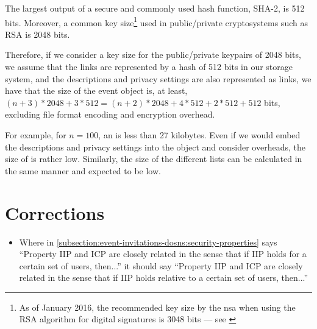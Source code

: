 \begin{itemize}
    The largest output of a secure and commonly used hash function, SHA-2, 
    is 512 bits. Moreover, a common key size\footnote{As of January 2016, the recommended 
    key size by the \ac{nsa} when using the RSA algorithm for digital signatures 
    is 3048 bits --- see \cite{iad16}} used in public/private cryptosystems such 
    as RSA is 2048 bits.
    
    Therefore, if we consider a key size for the public/private keypairs of 2048 bits, 
    we assume that the links are represented by a hash of 512 bits in our storage 
    system, and the descriptions and privacy settings are also represented as links, 
    we have that the size of the event object \eo{} is, at least, $(n + 3)*2048 + 3*512 = (n + 2)*2048 + 4*512 + 2*512 + 512$ 
    bits, excluding file format encoding and encryption overhead.
    
    For example, for $n = 100$, an \eo{} is less than 27 kilobytes. Even if we would 
    embed the descriptions and privacy settings into the object and consider overheads, 
    the size of \eo{} is rather low. Similarly, the size of the different lists 
    can be calculated in the same manner and expected to be low.
    
\end{itemize}

\section{Corrections}
    \label{section:thesis:appendix:ei:corrections}
\begin{itemize}
    \item Where in \cref{subsection:event-invitations-dosns:security-properties} 
    says ``Property IIP and ICP are closely related in the sense that if IIP holds 
    for a certain set of users, then...'' it should say ``Property IIP and ICP are 
    closely related in the sense that if IIP holds relative to a certain set of 
    users, then...''
\end{itemize}
